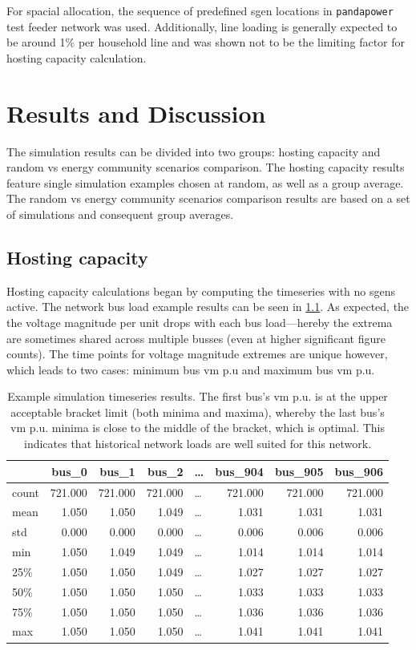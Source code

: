\documentclass[a4paper,10pt]{report}
\begin{document}
For spacial allocation, the sequence of predefined sgen locations in \texttt{pandapower} test feeder network was used. Additionally, line loading is generally expected to be around 1\% per household line and was shown not to be the limiting factor for hosting capacity calculation.


\chapter{Results and Discussion}
The simulation results can be divided into two groups: hosting capacity and random vs energy community scenarios comparison. The hosting capacity results feature single simulation examples chosen at random, as well as a group average. The random vs energy community scenarios comparison results are based on a set of simulations and consequent group averages.

\section{Hosting capacity}
Hosting capacity calculations began by computing the timeseries with no sgens active. The network bus load example results can be seen in \cref{hosting_time_series_table}. As expected, the the voltage magnitude per unit drops with each bus load---hereby the extrema are sometimes shared across multiple busses (even at higher significant figure counts). The time points for voltage magnitude extremes are unique however, which leads to two cases: minimum bus vm p.u and maximum bus vm p.u.

\begin{table}[htpb]
	\centering
	\begin{tabular}{lrrrlrrr}
		\toprule
		& bus\_0 & bus\_1 & bus\_2 & \dots & bus\_904 & bus\_905 & bus\_906 \\
		\midrule
		count & 721.000 & 721.000 & 721.000 & \dots & 721.000 & 721.000 & 721.000 \\
		mean & 1.050 & 1.050 & 1.049 & \dots & 1.031 & 1.031 & 1.031 \\
		std & 0.000 & 0.000 & 0.000 & \dots & 0.006 & 0.006 & 0.006 \\
		min & 1.050 & 1.049 & 1.049 & \dots & 1.014 & 1.014 & 1.014 \\
		25\% & 1.050 & 1.050 & 1.049 & \dots & 1.027 & 1.027 & 1.027 \\
		50\% & 1.050 & 1.050 & 1.050 & \dots & 1.033 & 1.033 & 1.033 \\
		75\% & 1.050 & 1.050 & 1.050 & \dots & 1.036 & 1.036 & 1.036 \\
		max & 1.050 & 1.050 & 1.050 & \dots & 1.041 & 1.041 & 1.041 \\
		\bottomrule
	\end{tabular}
	\caption[Example simulation timeseries results]{Example simulation timeseries results. The first bus's vm p.u. is at the upper acceptable bracket limit (both minima and maxima), whereby the last bus's vm p.u. minima is close to the middle of the bracket, which is optimal. This indicates that historical network loads are well suited for this network.}
	\label{hosting_time_series_table}
\end{table}
\end{document}
